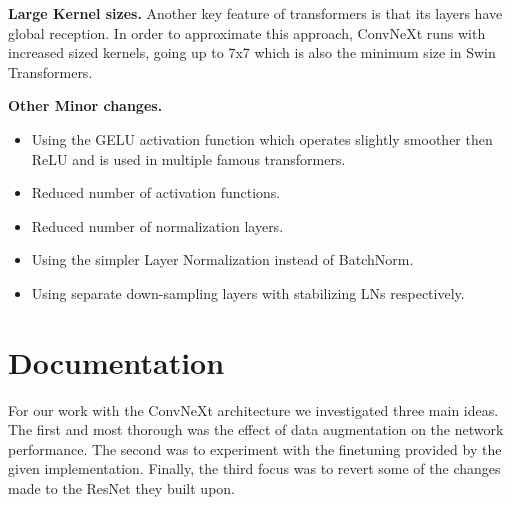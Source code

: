 \documentclass{article}
\begin{document}
\textbf{Large Kernel sizes.}
Another key feature of transformers is that its layers have global reception.
In order to approximate this approach, ConvNeXt runs with increased sized kernels, going up to 7x7 which is also the minimum size in Swin Transformers.

\textbf{Other Minor changes.}
\begin{itemize}
    \item Using the GELU activation function which operates slightly smoother then ReLU and is used in multiple famous transformers.
    \item Reduced number of activation functions.
    \item Reduced number of normalization layers.
    \item Using the simpler Layer Normalization instead of BatchNorm.
    \item Using separate down-sampling layers with stabilizing LNs respectively.
\end{itemize}


\section{Documentation}\label{sec:documentation}
For our work with the ConvNeXt architecture we investigated three main ideas.
The first and most thorough was the effect of data augmentation on the network performance.
The second was to experiment with the finetuning provided by the given implementation.
Finally, the third focus was to revert some of the changes~ made to the ResNet they built upon.
\end{document}
